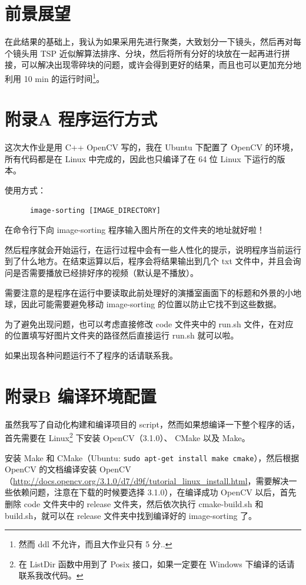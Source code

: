 \documentclass[a4paper, fontset=none]{article}
\begin{document}
\section{前景展望}
\label{sec:前景展望}

在此结果的基础上，我认为如果采用先进行聚类，大致划分一下镜头，然后再对每个镜头用 TSP 近似解算法排序、分块，然后将所有分好的块放在一起再进行拼接，可以解决出现零碎块的问题，或许会得到更好的结果，而且也可以更加充分地利用 10 min 的运行时间\footnote{然而 ddl 不允许，而且大作业只有 5 分..}。

\section*{附录A 程序运行方式}
\label{sec:程序运行方式}

这次大作业是用 C++ OpenCV 写的，我在 Ubuntu 下配置了 OpenCV 的环境，所有代码都是在 Linux 中完成的，因此也只编译了在 64 位 Linux 下运行的版本。

使用方式：

\begin{verbatim}
      image-sorting [IMAGE_DIRECTORY]
\end{verbatim}

在命令行下向 image-sorting 程序输入图片所在的文件夹的地址就好啦！

然后程序就会开始运行，在运行过程中会有一些人性化的提示，说明程序当前运行到了什么地方。在结束运算以后，程序会将结果输出到几个 txt 文件中，并且会询问是否需要播放已经排好序的视频（默认是不播放）。

需要注意的是程序在运行中要读取此前处理好的演播室画面下的标题和外景的小地球，因此可能需要避免移动 image-sorting 的位置以防止它找不到这些数据。

为了避免出现问题，也可以考虑直接修改 code 文件夹中的 run.sh 文件，在对应的位置填写好图片文件夹的路径然后直接运行 run.sh 就可以啦。

如果出现各种问题运行不了程序的话请联系我。

\section*{附录B 编译环境配置}
\label{sec:编译环境配置}

虽然我写了自动化构建和编译项目的 script，然而如果想编译一下整个程序的话，首先需要在 Linux\footnote{在 ListDir 函数中用到了 Posix 接口，如果一定要在 Windows 下编译的话请联系我改代码。} 下安装 OpenCV（3.1.0）、 CMake 以及 Make。

安装 Make 和 CMake（Ubuntu: \texttt{sudo apt-get install make cmake}），然后根据 OpenCV 的文档编译安装 OpenCV （\url{http://docs.opencv.org/3.1.0/d7/d9f/tutorial_linux_install.html}，需要解决一些依赖问题，注意在下载的时候要选择 3.1.0），在编译成功 OpenCV 以后，首先删除 code 文件夹中的 release 文件夹，然后依次执行 cmake-build.sh 和 build.sh，就可以在 release 文件夹中找到编译好的 image-sorting 了。
\end{document}
